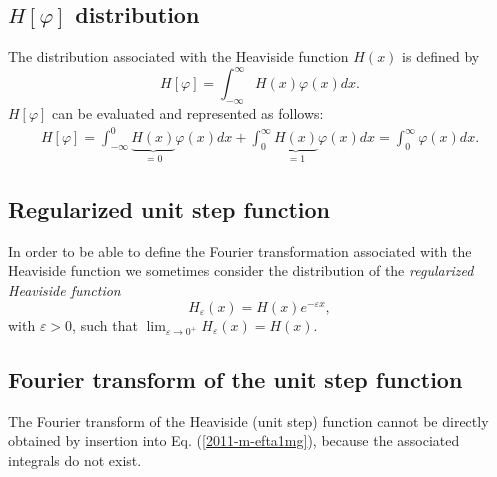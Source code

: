 \subsection{$H  \left[ \varphi \right]$ distribution}
The distribution associated with the Heaviside function $H(x)$ is defined by
\begin{equation}
H \left[ \varphi \right] =
\int_{-\infty}^\infty  H(x)  \varphi(x) dx.
 \end{equation}
$H  \left[ \varphi \right]$
can be evaluated and represented as follows:
\begin{equation}
\begin{split}
H  \left[ \varphi \right]
=
\int_{-\infty}^0  \underbrace{H(x)}_{=0} \varphi(x) dx
+
\int_{0}^\infty  \underbrace{H(x)}_{=1} \varphi(x) dx
=
\int_{0}^\infty      \varphi(x) dx
.
\end{split}
\end{equation}

\subsection{Regularized unit step function}
In order to be able to define the Fourier transformation
associated with the Heaviside function  we sometimes
consider the distribution of the {\em regularized Heaviside function}
\begin{equation}
H_\varepsilon (x) =H(x)e^{-\varepsilon x},
\label{2012-m-ch-di-rhfun}
\end{equation}
 with $\varepsilon >0$,
such that $\lim_{\varepsilon \rightarrow 0^+}  H_\varepsilon (x) =H (x)$.



\subsection{Fourier transform  of  the unit step function}

The Fourier transform of the Heaviside (unit step) function
cannot be directly obtained by insertion into Eq. (\ref{2011-m-efta1mg}), because the associated integrals do not exist.

